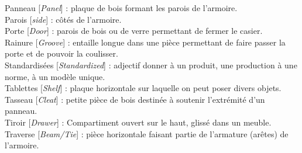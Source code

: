         Panneau [\textit{Panel}] : plaque de bois formant les parois de l’armoire.\\
        Parois [\textit{side}] :  côtés de l’armoire. \\
        Porte [\textit{Door}] : parois de bois ou de verre permettant de fermer le casier. \\
        Rainure [\textit{Groove}] : entaille longue dans une pièce permettant de faire passer la porte et de pouvoir la coulisser. \\
        Standardisées [\textit{Standardized}] : adjectif donner à un produit, une production à une norme, à un modèle unique. \\
        Tablettes [\textit{Shelf}] : plaque horizontale sur laquelle on peut poser divers objets. \\
        Tasseau [\textit{Cleat}] : petite pièce de bois destinée à soutenir l'extrémité d’un panneau. \\
        Tiroir [\textit{Drawer}] : Compartiment ouvert sur le haut, glissé dans un meuble. \\
        Traverse [\textit{Beam/Tie}] : pièce horizontale faisant partie de l’armature (arêtes) de l’armoire.
    
    \newpage
